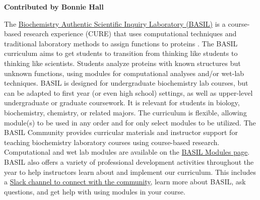 
\textbf{Contributed by Bonnie Hall}

The \href{(https://www.basilbiochem.org/home)}{Biochemistry Authentic Scientific Inquiry Laboratory (BASIL)} is a course-based research experience (CURE) that uses computational techniques and traditional laboratory methods to assign functions to proteins \cite{Roberts2019}. 
The BASIL curriculum aims to get students to transition from thinking like students to thinking like scientists. 
Students analyze proteins with known structures but unknown functions, using modules for computational analyses and/or wet-lab techniques. 
BASIL is designed for undergraduate biochemistry lab courses, but can be adapted to first year (or even high school) settings, as well as upper-level undergraduate or graduate coursework. It is relevant for students in biology, biochemistry, chemistry, or related majors. The curriculum is flexible, allowing module(s) to be used in any order and for only select modules to be utilized.
The BASIL Community provides curricular materials and instructor support for teaching biochemistry laboratory courses using course-based research. Computational and wet lab modules are available on the \href{https://www.basilbiochem.org/basil-modules}{BASIL Modules page}. 
BASIL also offers a variety of professional development activities throughout the year to help instructors learn about and implement our curriculum. This includes a \href{https://join.slack.com/t/onlinebasildiscussion/shared_invite/zt-1skdrd7br-x9MWjHCcNjmV0gkNftNMaw}{Slack channel to connect with the community}, learn more about BASIL, ask questions, and get help with using modules in your course.